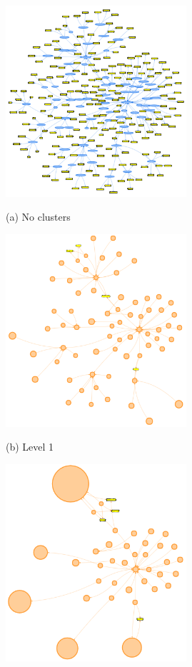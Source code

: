 \begin{figure}[htb]
\begin{minipage}[b]{.48\linewidth}
  \centering
  \centerline{\includegraphics[width=6.7cm]{img/cluster0.png}}
  \centerline{(a) No clusters}\medskip
  \vspace{.5cm}
\end{minipage}
\hfill
\begin{minipage}[b]{0.48\linewidth}
  \centering
  \centerline{\includegraphics[width=6.7cm]{img/cluster1.png}}
  \centerline{(b) Level 1}\medskip
  \vspace{.5cm}
\end{minipage}
\begin{minipage}[b]{0.48\linewidth}
\centering
  \centerline{\includegraphics[width=6.7cm]{img/cluster2.png}}

\end{minipage}
\end{figure}

